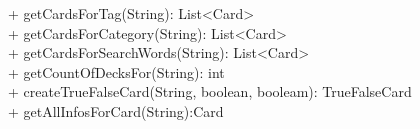 { 
    + getCardsForTag(String): List<Card> \\ 
    + getCardsForCategory(String): List<Card> \\ 
    + getCardsForSearchWords(String): List<Card> \\ 
    + getCountOfDecksFor(String): int\\
    + createTrueFalseCard(String, boolean, booleam): TrueFalseCard \\
    + getAllInfosForCard(String):Card\\
}{}